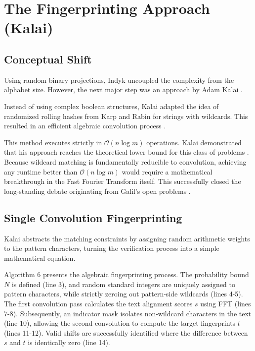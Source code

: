\chapter{The Fingerprinting Approach (Kalai)}

\section{Conceptual Shift}
Using random binary projections, Indyk uncoupled the complexity from the alphabet size. However, the next major step was an approach by Adam Kalai \cite{kalai2002}. 

Instead of using complex boolean structures, Kalai adapted the idea of randomized rolling hashes from Karp and Rabin \cite{karp1987efficient} for strings with wildcards. This resulted in an efficient algebraic convolution process \cite{kalai2002}. 

This method executes strictly in $\mathcal{O}(n \log m)$ operations. Kalai demonstrated that his approach reaches the theoretical lower bound for this class of problems \cite{kalai2002}. Because wildcard matching is fundamentally reducible to convolution, achieving any runtime better than $\mathcal{O}(n \log m)$ would require a mathematical breakthrough in the Fast Fourier Transform itself. This successfully closed the long-standing debate originating from Galil's open problems \cite{galil1985open}.

\section{Single Convolution Fingerprinting}
Kalai abstracts the matching constraints by assigning random arithmetic weights to the pattern characters, turning the verification process into a simple mathematical equation. 

Algorithm 6 presents the algebraic fingerprinting process. The probability bound $N$ is defined (line 3), and random standard integers are uniquely assigned to pattern characters, while strictly zeroing out pattern-side wildcards (lines 4-5). The first convolution pass calculates the text alignment scores $s$ using FFT (lines 7-8). Subsequently, an indicator mask isolates non-wildcard characters in the text (line 10), allowing the second convolution to compute the target fingerprints $t$ (lines 11-12). Valid shifts are successfully identified where the difference between $s$ and $t$ is identically zero (line 14).

